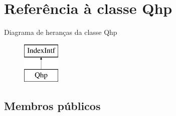 \hypertarget{class_qhp}{\section{Referência à classe Qhp}
\label{class_qhp}
}
Diagrama de heranças da classe Qhp\begin{figure}[H]
\begin{center}
\leavevmode
\includegraphics[height=2.000000cm]{class_qhp}
\end{center}
\end{figure}
\subsection*{Membros públicos}
